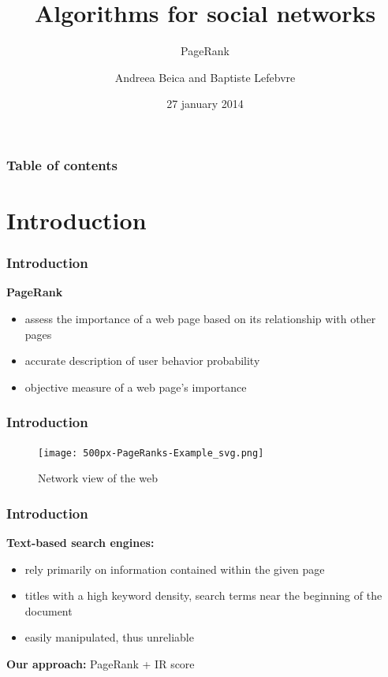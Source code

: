 \documentclass[9pt]{beamer}
\begin{document}
  
  \title{Algorithms for social networks}
  \subtitle{PageRank}
  \author{Andreea Beica and Baptiste Lefebvre}
  \date{27 january 2014}
  \maketitle

  
\begin{frame}
  \frametitle{Table of contents}
  \tableofcontents
\end{frame}


\section{Introduction}

\begin{frame}
\frametitle{Introduction}
\textbf{PageRank} 
\begin{itemize}
\item assess the importance of a web page based on its relationship with other pages
\item accurate description of user behavior probability
\item objective measure of a web page's importance
\end{itemize}
\end{frame}

\begin{frame}
\frametitle{Introduction}
\begin{figure}[h]
\texttt{[image: 500px-PageRanks-Example\_svg.png]}
\caption{Network view of the web}
\end{figure}
\end{frame}

\begin{frame}
\frametitle{Introduction}
\textbf{Text-based search engines:}
\begin{itemize}
\item rely primarily on information contained within the given page
\item titles with a high keyword density, search terms near the beginning of the document
\item easily manipulated, thus unreliable

\end{itemize}

\textbf{Our approach:} PageRank + IR score
\end{frame}
\end{document}
